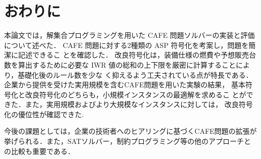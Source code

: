 \section{おわりに}

本論文では，解集合プログラミングを用いた CAFE 問題ソルバーの実装と評価
について述べた．
CAFE 問題に対する2種類の ASP 符号化を考案し，問題を簡潔に記述できるこ
とを確認した．
改良符号化は，装備仕様の燃費や予想販売台数を算出するために必要な IWR
値の総和の上下限を厳密に計算することにより，基礎化後のルール数を少な
く抑えるよう工夫されている点が特長である．
企業から提供を受けた実用規模を含むCAFE問題を用いた実験の結果，
基本符号化と改良符号化のどちらも，小規模インスタンスの最適解を求めるこ
とができた．また，実用規模およびより大規模なインスタンスに対しては，
改良符号化の優位性が確認できた.

今後の課題としては，企業の技術者へのヒアリングに基づくCAFE問題の拡張が
挙げられる．また，SATソルバー，制約プログラミング等の他のアプローチと
の比較も重要である．

